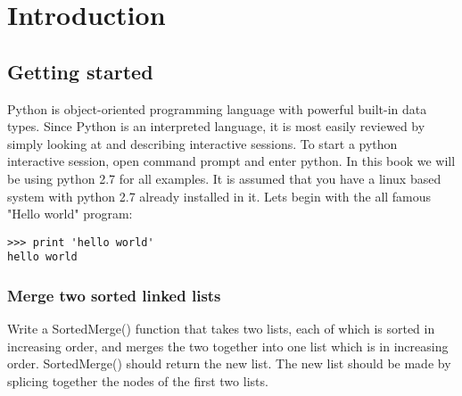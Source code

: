 \chapter{Introduction}


\section{Getting started}


Python is object-oriented programming language with powerful built-in data types. Since Python is an interpreted language, it is most easily reviewed by simply looking at and describing interactive sessions. To start a python interactive session, open command prompt and enter python.
In this book we will be using python 2.7 for all examples. It is assumed that you have a linux based system with python 2.7 already installed in it. Lets begin with the all famous "Hello world" program:

\begin{lstlisting}
>>> print 'hello world'
hello world
\end{lstlisting}

\subsection{Merge two sorted linked lists}
Write a SortedMerge() function that takes two lists, each of which is sorted in increasing order, and merges the two together into one list which is in increasing order. SortedMerge() should return the new list. The new list should be made by splicing together the nodes of the first two lists.

